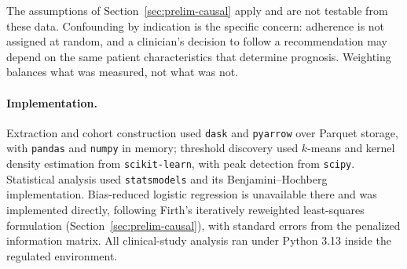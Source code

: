 The assumptions of Section~\ref{sec:prelim-causal} apply and are not testable from these data. Confounding by indication is the specific concern: adherence is not assigned at random, and a clinician's decision to follow a recommendation may depend on the same patient characteristics that determine prognosis. Weighting balances what was measured, not what was not.

\paragraph{Implementation.}
Extraction and cohort construction used \texttt{dask} and \texttt{pyarrow} over Parquet storage, with \texttt{pandas} and \texttt{numpy} in memory; threshold discovery used $k$-means and kernel density estimation from \texttt{scikit-learn}, with peak detection from \texttt{scipy}. Statistical analysis used \texttt{statsmodels} and its Benjamini--Hochberg implementation. Bias-reduced logistic regression is unavailable there and was implemented directly, following Firth's iteratively reweighted least-squares formulation (Section~\ref{sec:prelim-causal}), with standard errors from the penalized information matrix. All clinical-study analysis ran under Python 3.13 inside the regulated environment.
